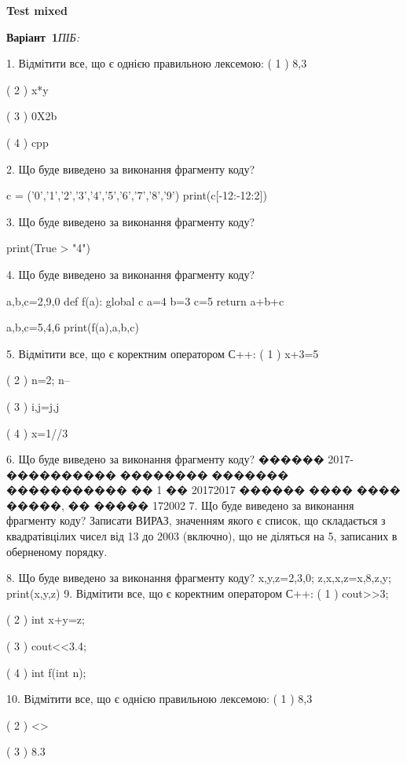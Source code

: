 \documentclass[11pt]{article}
\begin{document}
{\large\textbf{Test mixed}}

\textbf{Варіант \No\,1}\hfill \textit{ПІБ:}\,\underline{\hspace{60mm}}
\vspace{4mm}

1. Відмітити все, що є однією правильною лексемою:
( 1 ) 8,3

( 2 ) x*y

( 3 ) 0X2b

( 4 ) cpp

2. Що буде виведено за виконання фрагменту коду?

c = ('0','1','2','3','4','5','6','7','8','9')
print(c[-12:-12:2])


3. Що буде виведено за виконання фрагменту коду?

print(True > "4")

4. Що буде виведено за виконання фрагменту коду?

a,b,c=2,9,0
def f(a):
global c    a=4
    b=3
    c=5
    return a+b+c

a,b,c=5,4,6
print(f(a),a,b,c)

5. Відмітити все, що є коректним оператором С++:
( 1 ) x+3=5

( 2 ) n=2; n--

( 3 ) i,j=j,j

( 4 ) x=1//3

6. Що буде виведено за виконання фрагменту коду?
������ 2017-���������� �������� ������� ����������� �� 1 �� 20172017 ������ ���� ���� �����, �� ����� 172002
7. Що буде виведено за виконання фрагменту коду?
Записати ВИРАЗ, значенням якого є список, що складається з квадратівцілих чисел від 13 до 2003 (включно), що не діляться на 5, записаних в обернено\-му порядку.

8. Що буде виведено за виконання фрагменту коду?
x,y,z=2,3,0;  z,x,x,z=x,8,z,y;  print(x,y,z)
9. Відмітити все, що є коректним оператором С++:
( 1 ) cout>>3;

( 2 ) int x+y=z;

( 3 ) cout<<3.4;

( 4 ) int f(int n);

10. Відмітити все, що є однією правильною лексемою:
( 1 ) 8,3

( 2 ) <>

( 3 ) 8.3
\end{document}
